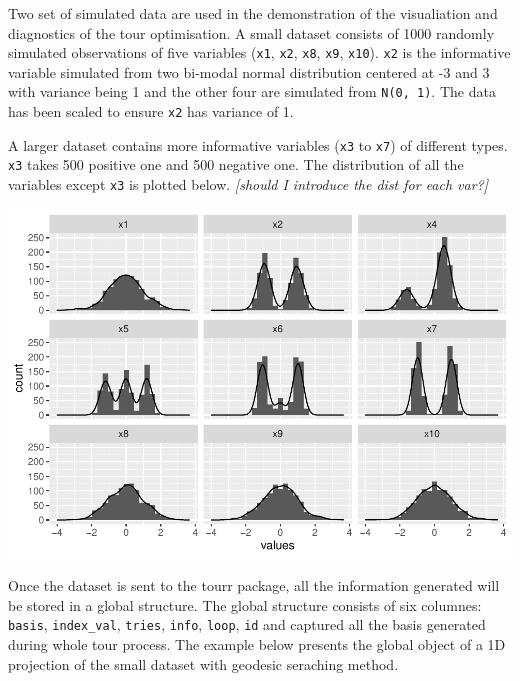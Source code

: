 \documentclass[12pt]{article}
\newenvironment{Shaded}{\begin{snugshade}}{\end{snugshade}}
\newcommand{\DecValTok}[1]{\textcolor[rgb]{0.00,0.00,0.81}{#1}}
\newcommand{\KeywordTok}[1]{\textcolor[rgb]{0.13,0.29,0.53}{\textbf{#1}}}
\newcommand{\NormalTok}[1]{#1}
\newcommand{\OperatorTok}[1]{\textcolor[rgb]{0.81,0.36,0.00}{\textbf{#1}}}
\newcommand{\StringTok}[1]{\textcolor[rgb]{0.31,0.60,0.02}{#1}}
\begin{document}
Two set of simulated data are used in the demonstration of the
visualiation and diagnostics of the tour optimisation. A small dataset
consists of 1000 randomly simulated observations of five variables
(\texttt{x1}, \texttt{x2}, \texttt{x8}, \texttt{x9}, \texttt{x10}).
\texttt{x2} is the informative variable simulated from two bi-modal
normal distribution centered at -3 and 3 with variance being 1 and the
other four are simulated from \texttt{N(0,\ 1)}. The data has been
scaled to ensure \texttt{x2} has variance of 1.

A larger dataset contains more informative variables (\texttt{x3} to
\texttt{x7}) of different types. \texttt{x3} takes 500 positive one and
500 negative one. The distribution of all the variables except
\texttt{x3} is plotted below. \emph{{[}should I introduce the dist for
each var?{]}}

\includegraphics{paper_files/figure-latex/origin-data-1.pdf}

Once the dataset is sent to the tourr package, all the information
generated will be stored in a global structure. The global structure
consists of six columnes: \texttt{basis}, \texttt{index\_val},
\texttt{tries}, \texttt{info}, \texttt{loop}, \texttt{id} and captured
all the basis generated during whole tour process. The example below
presents the global object of a 1D projection of the small dataset with
geodesic seraching method.

\begin{Shaded}
\end{Shaded}
\end{document}
